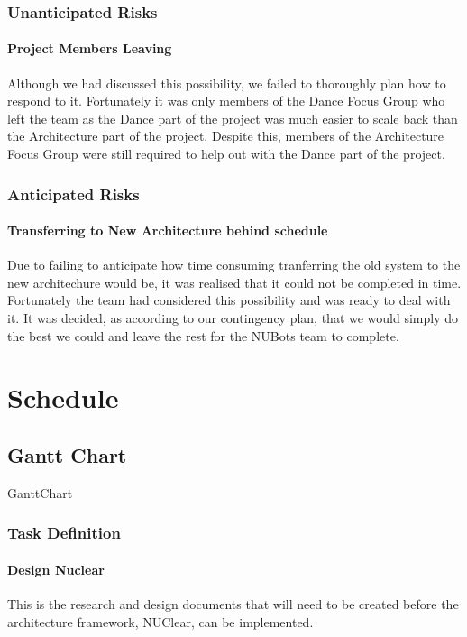 \documentclass[a4paper]{article}
\begin{document}
			\subsubsection{Unanticipated Risks}
				\paragraph{Project Members Leaving}  
					Although we had discussed this possibility, we failed to thoroughly plan how to respond to it. Fortunately it was only members of the Dance Focus Group who left the team as the Dance part of the project was much easier to scale back than the Architecture part of the project. Despite this, members of the Architecture Focus Group were still required to help out with the Dance part of the project.
			\subsubsection{Anticipated Risks}
				\paragraph{Transferring to New Architecture behind schedule}  
					Due to failing to anticipate how time consuming tranferring the old system to the new architechure would be, it was realised that it could not be completed in time. Fortunately the team had considered this possibility and was ready to deal with it. It was decided, as according to our contingency plan, that we would simply do the best we could and leave the rest for the NUBots team to complete.

	\section{Schedule}
		\subsection{Gantt Chart}
			{GanttChart}
			\subsubsection{Task Definition}
				\paragraph{Design Nuclear}
					This is the research and design documents that will need to be created before the architecture framework, NUClear, can be implemented.
\end{document}
